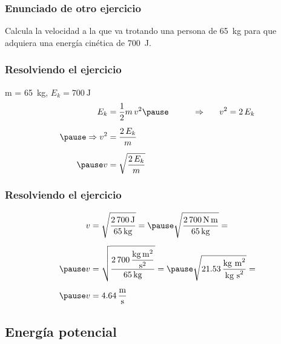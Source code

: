 \documentclass[14pt]{beamer}
\begin{document}
\begin{frame}
\frametitle{Enunciado de otro ejercicio}
Calcula la velocidad a la que va trotando una persona de \SI{65}{\kilo\gram} para que adquiera una energía cinética de \SI{700}{\joule}.
\end{frame}
\begin{frame}
\frametitle{Resolviendo el ejercicio}
\vspace*{-1cm}
 \pause m = \SI{65}{\kilo\gram}, \pause $E_{k} = \SI{700}{\joule}$
\\
\bigskip
\pause
{}
\begin{eqnarray*}
\begin{aligned}
E_{k} &= \dfrac{1}{2} m \, v^{2} \pause \hspace{1cm} \Rightarrow \hspace{0.5cm} \, v^{2} = 2 \, E_{k} \\[0.5em] \pause
\Rightarrow v^{2} &= \dfrac{2 \, E_{k}}{m} \\[0.5em] \pause
v &= \sqrt{\dfrac{2 \, E_{k}}{m}}
\end{aligned}
\end{eqnarray*}
\end{frame}
\begin{frame}
\frametitle{Resolviendo el ejercicio}
\pause
\begin{eqnarray*}
\begin{aligned}
v &= \sqrt{\dfrac{2 \, \SI{700}{\joule}}{\SI{65}{\kilo\gram}}} = \pause \sqrt{\dfrac{2 \, \SI{700}{\newton\meter}}{\SI{65}{\kilo\gram}}} = \\[0.5em]\pause 
v &= \sqrt{\dfrac{\displaystyle 2 \, \SI[per-mode=fraction]{700}{\kilo\gram\square\meter\per\square\second}}{\SI{65}{\kilo\gram}}} = \pause \sqrt{\num{21.53} \, \dfrac{\text{kg m}^{2}}{\text{kg s}^{2}}} = \\[0.5em] \pause
v &= \SI[per-mode=fraction]{4.64}{\meter\per\second}
\end{aligned}
\end{eqnarray*}
\end{frame}    

\subsection{Energía potencial}
\end{document}
